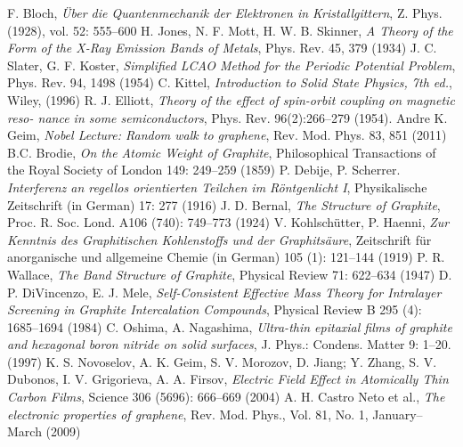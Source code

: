 \begin{thebibliography}{99}

 F. Bloch, \textit{Über die Quantenmechanik der Elektronen in Kristallgittern}, Z. Phys. (1928), vol. 52: 555–600
 H. Jones, N. F. Mott,  H. W. B. Skinner, \textit{A Theory of the Form of the X-Ray Emission Bands of Metals}, Phys. Rev. 45, 379 (1934)
 J. C. Slater, G. F. Koster, \textit{Simplified LCAO Method for the Periodic Potential Problem}, Phys. Rev. 94, 1498 (1954)
 C. Kittel, \textit{Introduction to Solid State Physics, 7th ed.}, Wiley, (1996) 
 R. J. Elliott, \textit{Theory of the effect of spin-orbit coupling on magnetic reso-
nance in some semiconductors}, Phys. Rev. 96(2):266–279 (1954).
 Andre K. Geim, \textit{Nobel Lecture: Random walk to graphene}, Rev. Mod. Phys. 83, 851 (2011)
 B.C. Brodie, \textit{On the Atomic Weight of Graphite},  Philosophical Transactions of the Royal Society of London 149: 249–259 (1859)
 P. Debije, P. Scherrer. \textit{Interferenz an regellos orientierten Teilchen im Röntgenlicht I}, Physikalische Zeitschrift (in German) 17: 277 (1916)
 J. D. Bernal, \textit{The Structure of Graphite}, Proc. R. Soc. Lond. A106 (740): 749–773 (1924)
 V. Kohlschütter, P. Haenni, \textit{Zur Kenntnis des Graphitischen Kohlenstoffs und der Graphitsäure}, Zeitschrift für anorganische und allgemeine Chemie (in German) 105 (1): 121–144  (1919)
 P. R. Wallace, \textit{The Band Structure of Graphite}, Physical Review 71: 622–634 (1947)
 D. P. DiVincenzo, E. J. Mele, \textit{Self-Consistent Effective Mass Theory for Intralayer Screening in Graphite Intercalation Compounds}, Physical Review B 295 (4): 1685–1694 (1984)
 C. Oshima, A. Nagashima, \textit{Ultra-thin epitaxial films of graphite and hexagonal boron nitride on solid surfaces}, J. Phys.: Condens. Matter 9: 1–20. (1997)
 K. S. Novoselov, A. K. Geim, S. V. Morozov, D. Jiang; Y. Zhang, S. V. Dubonos, I. V. Grigorieva, A. A. Firsov, \textit{Electric Field Effect in Atomically Thin Carbon Films}, Science 306 (5696): 666–669 (2004)
 A. H. Castro Neto et al., \textit{The electronic properties of graphene}, Rev. Mod. Phys., Vol. 81, No. 1, January–March (2009)
\end{thebibliography}
